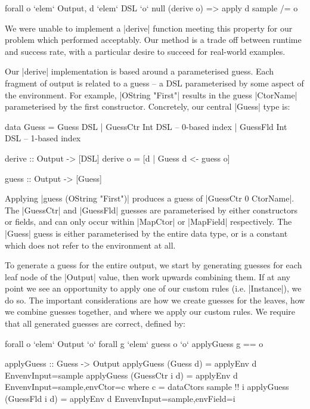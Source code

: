 \documentclass{llncs}
\begin{document}
\ignore\begin{code}
forall o `elem` Output, d `elem` DSL `o` null (derive o) => apply d sample /= o
\end{code}

We were unable to implement a |derive| function meeting this property for our problem which performed acceptably. Our method is a trade off between runtime and success rate, with a particular desire to succeed for real-world examples.

Our |derive| implementation is based around a parameterised guess. Each fragment of output is related to a guess -- a DSL parameterised by some aspect of the environment. For example, |OString "First"| results in the guess |CtorName| parameterised by the first constructor. Concretely, our central |Guess| type is:

\begin{code}
data Guess  =  Guess DSL
            |  GuessCtr Int DSL -- 0-based index
            |  GuessFld Int DSL -- 1-based index

derive :: Output -> [DSL]
derive o = [d | Guess d <- guess o]

guess :: Output -> [Guess]
\end{code}

Applying |guess (OString "First")| produces a guess of |GuessCtr 0 CtorName|. The |GuessCtr| and |GuessFld| guesses are parameterised by either constructors or fields, and can only occur within |MapCtor| or |MapField| respectively. The |Guess| guess is either parameterised by the entire data type, or is a constant which does not refer to the environment at all.

To generate a guess for the entire output, we start by generating guesses for each leaf node of the |Output| value, then work upwards combining them. If at any point we see an opportunity to apply one of our custom rules (i.e. |Instance|), we do so. The important considerations are how we create guesses for the leaves, how we combine guesses together, and where we apply our custom rules. We require that all generated guesses are correct, defined by:

\ignore\begin{code}
forall o `elem` Output `o` forall g `elem` guess o `o` applyGuess g == o
\end{code}
\begin{code}
applyGuess :: Guess -> Output
applyGuess (Guess       d) = applyEnv d Env{envInput=sample}
applyGuess (GuessCtr i  d) = applyEnv d Env{envInput=sample,envCtor=c}
    where c = dataCtors sample !! i
applyGuess (GuessFld i  d) = applyEnv d Env{envInput=sample,envField=i}
\end{code}
\end{document}
